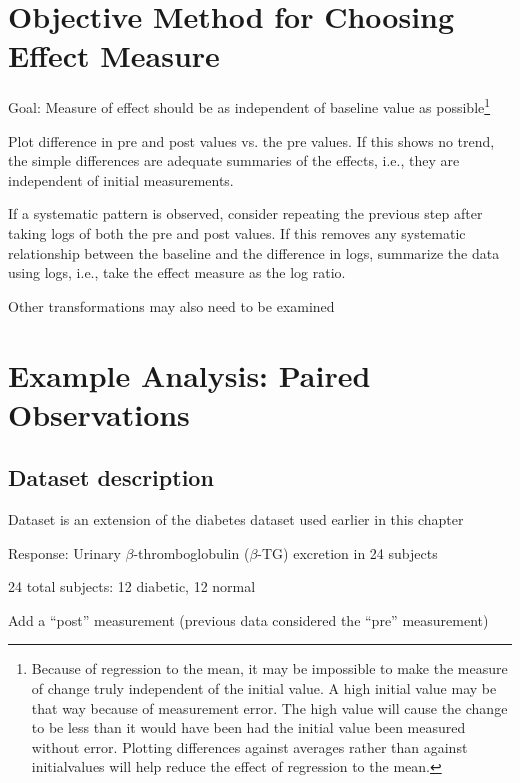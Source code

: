 \section{Objective Method for Choosing Effect Measure} 
\bi
\item   Goal: Measure of effect should be as independent of baseline value as possible\footnote{Because of regression to the mean, it may be impossible to make the measure of change truly independent of the initial value.  A high initial value may be that way because of measurement error.  The high value will cause the change to be less than it would have been had the initial value been measured without error.  Plotting differences against averages rather than against initialvalues will help reduce the effect of regression to the mean.}
\item   Plot difference in pre and post values vs. the pre values.  If this shows no trend, the simple differences are adequate summaries of the effects, i.e., they are independent of initial measurements.
\item   If a systematic pattern is observed, consider repeating the previous step after taking logs of both the pre and post values.  If this removes any systematic relationship between the baseline and the difference in logs, summarize the data using logs, i.e., take the effect measure as the log ratio.
\item   Other transformations may also need to be examined
\ei


\section{Example Analysis: Paired Observations}  

\subsection{Dataset description}
\bi
  \item Dataset is an extension of the diabetes dataset used earlier in this chapter
  \item Response: Urinary $\beta$-thromboglobulin ($\beta$-TG) excretion in 24 subjects
  \item 24 total subjects: 12 diabetic, 12 normal
  \item Add a ``post'' measurement (previous data considered the ``pre'' measurement)
\ei

